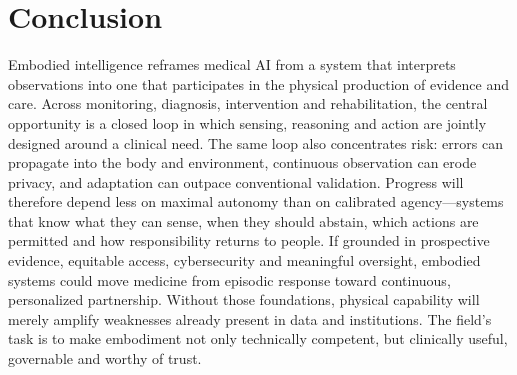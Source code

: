 \section{Conclusion}

Embodied intelligence reframes medical AI from a system that interprets observations into one that participates in the physical production of evidence and care. Across monitoring, diagnosis, intervention and rehabilitation, the central opportunity is a closed loop in which sensing, reasoning and action are jointly designed around a clinical need. The same loop also concentrates risk: errors can propagate into the body and environment, continuous observation can erode privacy, and adaptation can outpace conventional validation. Progress will therefore depend less on maximal autonomy than on calibrated agency---systems that know what they can sense, when they should abstain, which actions are permitted and how responsibility returns to people. If grounded in prospective evidence, equitable access, cybersecurity and meaningful oversight, embodied systems could move medicine from episodic response toward continuous, personalized partnership. Without those foundations, physical capability will merely amplify weaknesses already present in data and institutions. The field's task is to make embodiment not only technically competent, but clinically useful, governable and worthy of trust.

